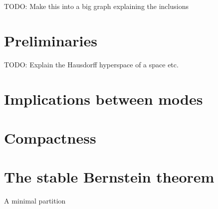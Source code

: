 \documentclass[reqno,10pt]{amsart}
\theoremstyle{definition}
\numberwithin{equation}{section}
\begin{document}
TODO: Make this into a big graph explaining the inclusions

\section{Preliminaries}
TODO: Explain the Hausdorff hyperspace of a space etc.

\section{Implications between modes}

\section{Compactness}

\section{The stable Bernstein theorem}
A minimal partition

\printbibliography
\end{document}
